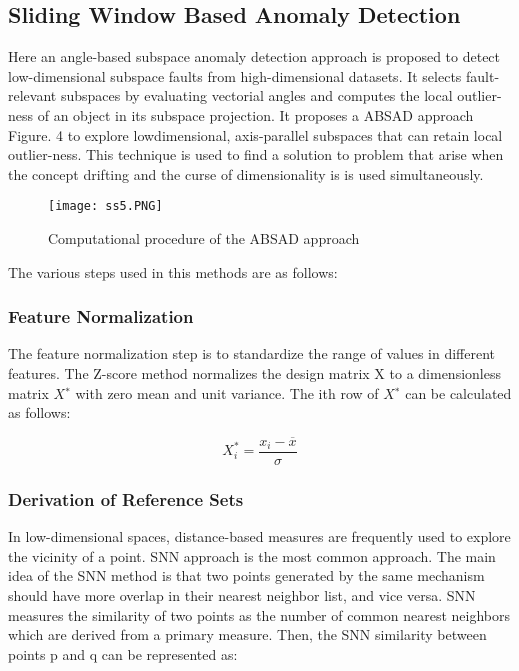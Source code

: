\documentclass[10pt,a4paper,journal]{IEEEtran}
\begin{document}
 
 
 
 
 
 
 
 
 
 
 
 
 
 
 

 
\subsection{Sliding Window Based Anomaly Detection}
Here an angle-based subspace anomaly detection approach is proposed to detect low-dimensional subspace faults from high-dimensional datasets. It selects fault-relevant \cite{14} subspaces by evaluating vectorial angles and computes the local outlier-ness of an object in its subspace projection. It proposes  a ABSAD approach Figure. 4 to explore lowdimensional, axis-parallel
subspaces that can retain local outlier-ness. This technique is used to find a solution to problem that arise when the concept drifting and the curse of dimensionality is is used simultaneously.

\begin{figure}[htbp]
	\centering
	\texttt{[image: ss5.PNG]}
	\caption[Computational procedure of the ABSAD approach ]{Computational procedure of the ABSAD approach \cite{3}}
\label{Fig 2}
 \end{figure}
The various steps used in this methods are as follows:



\subsubsection{Feature Normalization}
The feature normalization step is to standardize the range
of values in different features. The Z-score method normalizes the design matrix X to a dimensionless matrix $X^∗$ with zero mean and unit variance.
The ith row of $X^∗$ can be calculated as follows:

\begin{equation}
X_{i}^{*}=\frac{x_i-\overline{x}}{\sigma}
\end{equation}




\subsubsection{Derivation of Reference Sets}
In low-dimensional spaces, distance-based measures are frequently used to explore the vicinity of a point. SNN approach is the most common approach. The main idea of the SNN method is that two points generated by the same mechanism should have more overlap in their nearest neighbor list, and vice versa. SNN measures
the similarity of two points as the number of common nearest neighbors which are derived from a primary measure. Then, the SNN similarity between points p and q can be
represented as:
\end{document}
